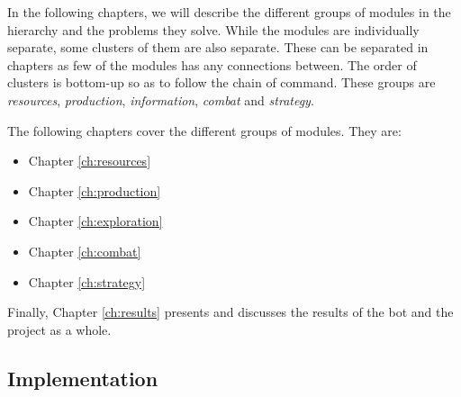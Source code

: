 
In the following chapters, we will describe the different groups of modules in the hierarchy and the problems they solve. While the modules are individually separate, some clusters of them are also separate. These can be separated in chapters as few of the modules has any connections between. The order of clusters is bottom-up so as to follow the chain of command. These groups are \emph{resources}, \emph{production}, \emph{information}, \emph{combat} and \emph{strategy}.

The following chapters cover the different groups of modules. They are:
\begin{itemize}
	\item Chapter \ref{ch:resources}
	\item Chapter \ref{ch:production}
	\item Chapter \ref{ch:exploration}
	\item Chapter \ref{ch:combat}
	\item Chapter \ref{ch:strategy}
\end{itemize}

Finally, Chapter \ref{ch:results} presents and discusses the results of the bot and the project as a whole.

	\subsection{Implementation}
		
